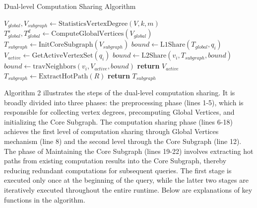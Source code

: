 \documentclass[10pt,journal,compsoc]{IEEEtran}
\begin{document}
\begin{algorithm}[t]
  \caption{Dual-level Computation Sharing Algorithm}
  \begin{algorithmic}[1]
      \State $V_{{global}}, V_{{subgraph}} \gets \text{StatisticsVertexDegree}(V, k, m)$
      \State $T_{{global}}^s,T_{{global}}^d \gets \text{ComputeGlobalVertices}(V_{{global}})$
      \State $T_{{subgraph}} \gets \text{InitCoreSubgraph}(V_{{subgraph}})$
    \EndFunction
        \State $bound \gets \text{L1Share}(T_{{global}}, {q_i})$
        \State $V_{{active}} \gets \text{GetActiveVertexSet}({q_i})$
            \State $bound \gets \text{L2Share}(v_i, T_{{subgraph}},bound)$
          \EndIf
          \State $bound \gets \text{travNeighbors}(v_i, V_{{active}}, bound)$
        \EndFor
      \EndFor
      \State \textbf{return} $V_{{active}}$
    \EndFunction
      \State $T_{{subgraph}} \gets \text{ExtractHotPath}(R)$
      \State \textbf{return} $T_{{subgraph}}$
    \EndFunction    
  \end{algorithmic}
\end{algorithm}
Algorithm 2 illustrates the steps of the dual-level computation sharing. It is broadly divided into three phases: the preprocessing phase (lines 1-5), which is responsible for collecting vertex degrees, precomputing Global Vertices, and initializing the Core Subgraph. The computation sharing phase (lines 6-18) achieves the first level of computation sharing through Global Vertices mechanism (line 8) and the second level through the Core Subgraph (line 12). The phase of Maintaining the Core Subgraph (lines 19-22) involves extracting hot paths from existing computation results into the Core Subgraph, thereby reducing redundant computations for subsequent queries.
The first stage is executed only once at the beginning of the query, while the latter two stages are iteratively executed throughout the entire runtime. Below are explanations of key functions in the algorithm.
\end{document}
